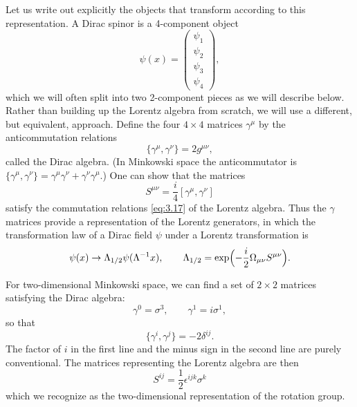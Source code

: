 Let us write out explicitly the objects that transform according to this
representation.  A Dirac spinor is a 4-component object
\begin{equation}
  \psi(x) = \begin{pmatrix}\psi_1\\ \psi_2\\ \psi_3\\ \psi_4\end{pmatrix},
\end{equation}
which we will often split into two 2-component pieces as we will describe
below.  Rather than building up the Lorentz algebra from scratch, we will use
a different, but equivalent, approach.  Define the four $4\times4$ matrices
$\gamma^\mu$ by the anticommutation relations
\begin{equation}
  \{\gamma^\mu, \gamma^\nu\} = 2g^{\mu\nu},
  \label{eq:3.22b}
\end{equation}
called the Dirac algebra.  (In Minkowski space the anticommutator is
$\{\gamma^\mu,\gamma^\nu\} = \gamma^\mu\gamma^\nu + \gamma^\nu\gamma^\mu$.)
One can show that the matrices
\begin{equation}
  S^{\mu\nu} = \frac{i}{4}[\gamma^\mu, \gamma^\nu]
  \label{eq:3.23}
\end{equation}
satisfy the commutation relations \eqref{eq:3.17} of the Lorentz algebra.
Thus the $\gamma$ matrices provide a representation of the Lorentz
generators, in which the transformation law of a Dirac field $\psi$ under a
Lorentz transformation is
\begin{equation}
  \psi(x) \to \Lambda_{1/2}\psi(\Lambda^{-1}x),
  \qquad \Lambda_{1/2} = \exp\Bigl(
    -\frac{i}{2}\Omega_{\mu\nu}S^{\mu\nu}\Bigr).
  \label{eq:3.24}
\end{equation}

For two-dimensional Minkowski space, we can find a set of $2\times2$
matrices satisfying the Dirac algebra:
\begin{equation}
  \gamma^0 = \sigma^3,\qquad \gamma^1 = i\sigma^1,
\end{equation}
so that
\begin{equation}
  \{\gamma^i, \gamma^j\} = -2\delta^{ij}.
  \label{eq:3.24b}
\end{equation}
The factor of $i$ in the first line and the minus sign in the second line are
purely conventional.  The matrices representing the Lorentz algebra are then
\begin{equation}
  S^{ij} = \frac{1}{2}\epsilon^{ijk}\sigma^k
  \label{eq:3.25}
\end{equation}
which we recognize as the two-dimensional representation of the rotation
group.

